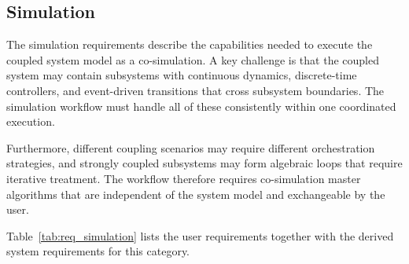 \subsection{Simulation}
\label{sec:req_simulation}

The simulation requirements describe the capabilities needed to execute the coupled system model as a co-simulation.
A key challenge is that the coupled system may contain subsystems with continuous dynamics, discrete-time controllers, and event-driven transitions that cross subsystem boundaries.
The simulation workflow must handle all of these consistently within one coordinated execution.

Furthermore, different coupling scenarios may require different orchestration strategies, and strongly coupled subsystems may form algebraic loops that require iterative treatment.
The workflow therefore requires co-simulation master algorithms that are independent of the system model and exchangeable by the user.

Table~\ref{tab:req_simulation} lists the user requirements together with
the derived system requirements for this category.

